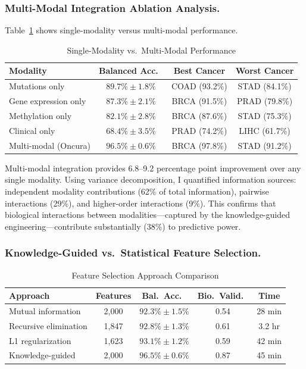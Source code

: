 \documentclass[manuscript, screen, review]{jair}
\begin{document}
\subsubsection{Multi-Modal Integration Ablation Analysis.}

Table~\ref{tab:modality} shows single-modality versus multi-modal performance.

\begin{table}[!t]
  \caption{Single-Modality vs.\ Multi-Modal Performance}
  \label{tab:modality}
  \centering
  \small
  \begin{tabular}{lccc}
    \toprule
    Modality & Balanced Acc.\ & Best Cancer & Worst Cancer \\
    \midrule
    Mutations only       & $89.7\%\pm1.8\%$ & COAD (93.2\%) & STAD (84.1\%) \\
    Gene expression only & $87.3\%\pm2.1\%$ & BRCA (91.5\%) & PRAD (79.8\%) \\
    Methylation only     & $82.1\%\pm2.8\%$ & BRCA (87.6\%) & STAD (75.3\%) \\
    Clinical only        & $68.4\%\pm3.5\%$ & PRAD (74.2\%) & LIHC (61.7\%) \\
    Multi-modal (Oncura) & $96.5\%\pm0.6\%$ & BRCA (97.8\%) & STAD (91.2\%) \\
    \bottomrule
  \end{tabular}
\end{table}

Multi-modal integration provides 6.8--9.2 percentage point improvement over any single modality. Using variance decomposition, I quantified information sources: independent modality contributions (62\% of total information), pairwise interactions (29\%), and higher-order interactions (9\%). This confirms that biological interactions between modalities---captured by the knowledge-guided engineering---contribute substantially (38\%) to predictive power.

\subsubsection{Knowledge-Guided vs.\ Statistical Feature Selection.}

\begin{table}[!t]
  \caption{Feature Selection Approach Comparison}
  \label{tab:features}
  \centering
  \small
  \begin{tabular}{lcccc}
    \toprule
    Approach & Features & Bal.\ Acc.\ & Bio.\ Valid.\ & Time \\
    \midrule
    Mutual information    & 2,000 & $92.3\%\pm1.5\%$ & 0.54 & 28 min \\
    Recursive elimination & 1,847 & $92.8\%\pm1.3\%$ & 0.61 & 3.2 hr \\
    L1 regularization     & 1,623 & $93.1\%\pm1.2\%$ & 0.59 & 42 min \\
    Knowledge-guided      & 2,000 & $96.5\%\pm0.6\%$ & 0.87 & 45 min \\
    \bottomrule
  \end{tabular}
\end{table}
\end{document}

